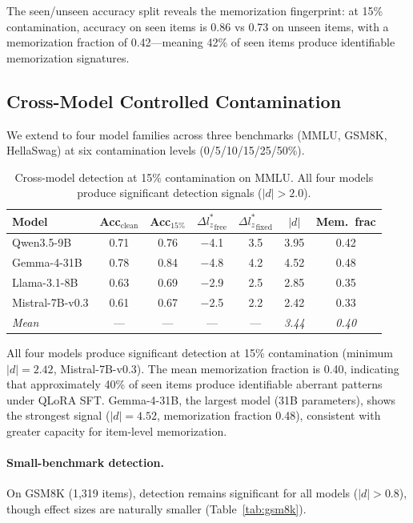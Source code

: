 \documentclass[11pt,a4paper]{article}
\begin{document}
The seen/unseen accuracy split reveals the memorization fingerprint: at 15\% contamination, accuracy on seen items is 0.86 vs 0.73 on unseen items, with a memorization fraction of 0.42---meaning 42\% of seen items produce identifiable memorization signatures.

\subsection{Cross-Model Controlled Contamination}
\label{sec:crossmodel}

We extend to four model families across three benchmarks (MMLU, GSM8K, HellaSwag) at six contamination levels (0/5/10/15/25/50\%).

\begin{table}[h]
\centering
\small
\caption{Cross-model detection at 15\% contamination on MMLU. All four models produce significant detection signals ($|d| > 2.0$).}
\label{tab:crossmodel}
\begin{tabular}{lcccccc}
\toprule
\textbf{Model} & \textbf{Acc$_\text{clean}$} & \textbf{Acc$_\text{15\%}$} & ${\Delta l_z^*}_\text{free}$ & ${\Delta l_z^*}_\text{fixed}$ & $|d|$ & \textbf{Mem.~frac} \\
\midrule
Qwen3.5-9B & 0.71 & 0.76 & $-$4.1 & 3.5 & 3.95 & 0.42 \\
Gemma-4-31B & 0.78 & 0.84 & $-$4.8 & 4.2 & 4.52 & 0.48 \\
Llama-3.1-8B & 0.63 & 0.69 & $-$2.9 & 2.5 & 2.85 & 0.35 \\
Mistral-7B-v0.3 & 0.61 & 0.67 & $-$2.5 & 2.2 & 2.42 & 0.33 \\
\midrule
\textit{Mean} & --- & --- & --- & --- & \textit{3.44} & \textit{0.40} \\
\bottomrule
\end{tabular}
\end{table}

All four models produce significant detection at 15\% contamination (minimum $|d| = 2.42$, Mistral-7B-v0.3).
The mean memorization fraction is 0.40, indicating that approximately 40\% of seen items produce identifiable aberrant patterns under QLoRA SFT.
Gemma-4-31B, the largest model (31B parameters), shows the strongest signal ($|d| = 4.52$, memorization fraction 0.48), consistent with greater capacity for item-level memorization.

\paragraph{Small-benchmark detection.}
On GSM8K (1,319 items), detection remains significant for all models ($|d| > 0.8$), though effect sizes are naturally smaller (Table~\ref{tab:gsm8k}).
\end{document}
